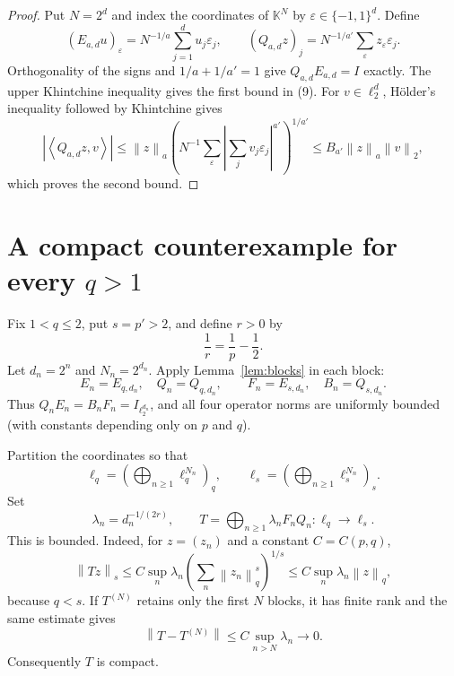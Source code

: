 \documentclass[11pt]{article}
\newcommand{\K}{\mathbb K}
\newcommand{\norm}[1]{\left\lVert #1\right\rVert}
\newcommand{\ip}[2]{\left\langle #1,#2\right\rangle}
\begin{document}
\begin{proof}
Put $N=2^d$ and index the coordinates of $\K^N$ by
$\varepsilon\in\{-1,1\}^d$.  Define
\[
 (E_{a,d}u)_\varepsilon
 =N^{-1/a}\sum_{j=1}^d u_j\varepsilon_j,
 \qquad
 (Q_{a,d}z)_j
 =N^{-1/a'}\sum_\varepsilon z_\varepsilon\varepsilon_j.               \tag{10}
\]
Orthogonality of the signs and $1/a+1/a'=1$ give
$Q_{a,d}E_{a,d}=I$ exactly.  The upper Khintchine inequality gives the first
bound in (9).  For $v\in\ell_2^d$, H\"older's inequality followed by
Khintchine gives
\[
 |\ip{Q_{a,d}z}{v}|
 \le\norm z_a
 \left(N^{-1}\sum_\varepsilon
 \left|\sum_jv_j\varepsilon_j\right|^{a'}\right)^{1/a'}
 \le B_{a'}\norm z_a\norm v_2,
\]
which proves the second bound.
\end{proof}

\section{A compact counterexample for every \texorpdfstring{$q>1$}{q>1}}

Fix $1<q\le2$, put $s=p'>2$, and define $r>0$ by
\[
 \frac1r=\frac1p-\frac12.                                              \tag{11}
\]
Let $d_n=2^n$ and $N_n=2^{d_n}$.  Apply Lemma~\ref{lem:blocks} in each block:
\[
 E_n=E_{q,d_n},\quad Q_n=Q_{q,d_n},\qquad
 F_n=E_{s,d_n},\quad B_n=Q_{s,d_n}.                                    \tag{12}
\]
Thus $Q_nE_n=B_nF_n=I_{\ell_2^{d_n}}$, and all four operator norms are
uniformly bounded (with constants depending only on $p$ and $q$).

Partition the coordinates so that
\[
 \ell_q=\left(\bigoplus_{n\ge1}\ell_q^{N_n}\right)_q,
 \qquad
 \ell_s=\left(\bigoplus_{n\ge1}\ell_s^{N_n}\right)_s.
\]
Set
\[
 \lambda_n=d_n^{-1/(2r)},\qquad
 T=\bigoplus_{n\ge1}\lambda_nF_nQ_n:\ell_q\to\ell_s.                 \tag{13}
\]
This is bounded.  Indeed, for $z=(z_n)$ and a constant $C=C(p,q)$,
\[
 \norm{Tz}_s
 \le C\sup_n\lambda_n
       \left(\sum_n\norm{z_n}_q^s\right)^{1/s}
 \le C\sup_n\lambda_n\norm z_q,                                      \tag{14}
\]
because $q<s$.  If $T^{(N)}$ retains only the first $N$ blocks, it has finite
rank and the same estimate gives
\[
 \norm{T-T^{(N)}}\le C\sup_{n>N}\lambda_n\longrightarrow0.           \tag{15}
\]
Consequently $T$ is compact.
\end{document}
